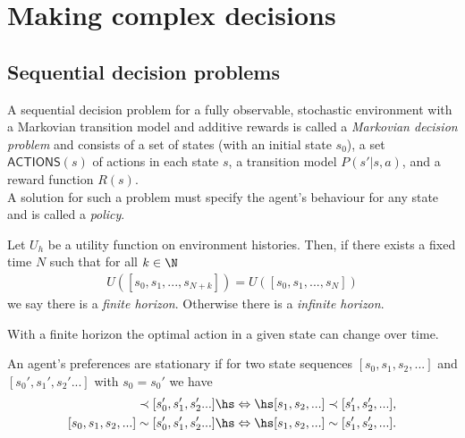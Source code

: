 \documentclass{article}
\begin{document}
\section{Making complex decisions}


\subsection{Sequential decision problems}

\begin{definition}
    A sequential decision problem for a fully observable, stochastic environment
    with a Markovian transition model and additive rewards is called a \emph{Markovian
        decision problem} and consists of a set of states (with an initial state $s_0$),
    a set $\textsf{ACTIONS}(s)$ of
    actions in each state $s$, a transition model $P(s'|s,a)$, and a reward function
    $R(s)$.\\
    A solution for such a problem must specify the agent's behaviour for any state
    and is called a \emph{policy}.
\end{definition}

\begin{definition}[R\&N p. 648]
    Let $U_h$ be a utility function on environment histories. Then, if there exists
    a fixed time $N$ such that for all $k\in\N$
    \begin{align*}
        U([s_0,s_1,...,s_{N+k}]) = U([s_0,s_1,...,s_N])
    \end{align*}
    we say there is a \emph{finite horizon}. Otherwise there is a \emph{infinite
        horizon}.
\end{definition}

\begin{theorem}
    With a finite horizon the optimal action in a given state can change over time.
\end{theorem}

\begin{definition}[R\&N p. 649]
    An agent's preferences are stationary if for two state sequences
    $[s_0, s_1, s_2, ...]$ and $[s_0', s_1', s_2'...]$ with $s_0=s_0'$ we have
    \begin{align*}
        [s_0, s_1, s_2, ...] \prec [s_0', s_1', s_2'...]\hs & \Leftrightarrow\hs
        [s_1, s_2, ...] \prec [s_1', s_2', ...],                                 \\
        [s_0, s_1, s_2, ...] \sim [s_0', s_1', s_2'...]\hs  & \Leftrightarrow\hs
        [s_1, s_2, ...] \sim [s_1', s_2', ...].
    \end{align*}
\end{definition}
\end{document}
